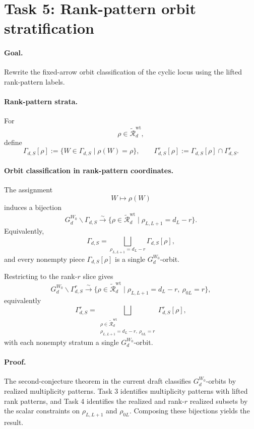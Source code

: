 \section*{Task 5: Rank-pattern orbit stratification}

\paragraph{Goal.}
Rewrite the fixed-arrow orbit classification of the cyclic locus using the
lifted rank-pattern labels.

\paragraph{Rank-pattern strata.}
For
\[
\rho\in \widetilde{\mathcal R}_d^{\mathrm{wt}},
\]
define
\[
\Gamma_{d,S}[\rho]
:=
\{W\in \Gamma_{d,S}\mid \rho(W)=\rho\},
\qquad
\Gamma_{d,S}^r[\rho]
:=
\Gamma_{d,S}[\rho]\cap \Gamma_{d,S}^r.
\]

\paragraph{Orbit classification in rank-pattern coordinates.}
The assignment
\[
W\longmapsto \rho(W)
\]
induces a bijection
\[
G_d^{W_0}\backslash \Gamma_{d,S}
\xrightarrow{\sim}
\{\rho\in \widetilde{\mathcal R}_d^{\mathrm{wt}}\mid \rho_{L,L+1}=d_L-r\}.
\]
Equivalently,
\[
\Gamma_{d,S}
=
\bigsqcup_{\rho_{L,L+1}=d_L-r}\Gamma_{d,S}[\rho],
\]
and every nonempty piece \(\Gamma_{d,S}[\rho]\) is a single
\(G_d^{W_0}\)-orbit.

Restricting to the rank-\(r\) slice gives
\[
G_d^{W_0}\backslash \Gamma_{d,S}^r
\xrightarrow{\sim}
\{\rho\in \widetilde{\mathcal R}_d^{\mathrm{wt}}\mid \rho_{L,L+1}=d_L-r,\ \rho_{0L}=r\},
\]
equivalently
\[
\Gamma_{d,S}^r
=
\bigsqcup_{\substack{\rho\in \widetilde{\mathcal R}_d^{\mathrm{wt}}\\
\rho_{L,L+1}=d_L-r,\ \rho_{0L}=r}}
\Gamma_{d,S}^r[\rho],
\]
with each nonempty stratum a single \(G_d^{W_0}\)-orbit.

\paragraph{Proof.}
The second-conjecture theorem in the current draft classifies
\(G_d^{W_0}\)-orbits by realized multiplicity patterns. Task 3 identifies
multiplicity patterns with lifted rank patterns, and Task 4 identifies the
realized and rank-\(r\) realized subsets by the scalar constraints on
\(\rho_{L,L+1}\) and \(\rho_{0L}\). Composing these bijections yields the
result.


